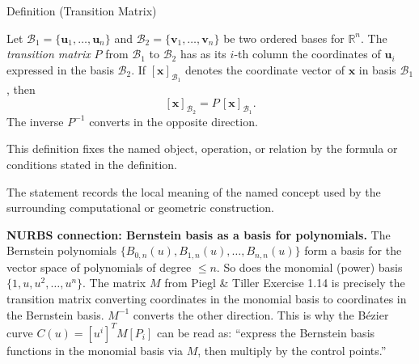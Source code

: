\begin{definitionbox}{Definition (Transition Matrix)}
\begin{definition}
\label{def:transition-matrix}
Let $\mathcal{B}_1 = \{\mathbf{u}_1, \ldots, \mathbf{u}_n\}$ and
$\mathcal{B}_2 = \{\mathbf{v}_1, \ldots, \mathbf{v}_n\}$ be two ordered bases for $\mathbb{R}^n$.
The \emph{transition matrix} $P$ from $\mathcal{B}_1$ to $\mathcal{B}_2$ has
as its $i$-th column the coordinates of $\mathbf{u}_i$ expressed in the basis $\mathcal{B}_2$.
If $[\mathbf{x}]_{\mathcal{B}_1}$ denotes the coordinate vector of $\mathbf{x}$ in basis $\mathcal{B}_1$, then
\[
  [\mathbf{x}]_{\mathcal{B}_2} = P \,[\mathbf{x}]_{\mathcal{B}_1}.
\]
The inverse $P^{-1}$ converts in the opposite direction.
\end{definition}
\end{definitionbox}
\begin{remark*}
This definition fixes the named object, operation, or relation by the formula
or conditions stated in the definition.
\end{remark*}

\begin{remark*}[Interpretation]
The statement records the local meaning of the named concept used by the
surrounding computational or geometric construction.
\end{remark*}

\DefinitionalRoot

\begin{remark*}[Exposition]
\textbf{NURBS connection: Bernstein basis as a basis for polynomials.}
The Bernstein polynomials $\{B_{0,n}(u), B_{1,n}(u), \ldots, B_{n,n}(u)\}$ form a
basis for the vector space of polynomials of degree $\leq n$.
So does the monomial (power) basis $\{1, u, u^2, \ldots, u^n\}$.
The matrix $M$ from Piegl \& Tiller Exercise 1.14 is precisely the transition
matrix converting coordinates in the monomial basis to coordinates in the Bernstein basis.
$M^{-1}$ converts the other direction.
This is why the B\'{e}zier curve $C(u) = [u^i]^T M [P_i]$ can be read as:
``express the Bernstein basis functions in the monomial basis via $M$, then
multiply by the control points.''
\end{remark*}
